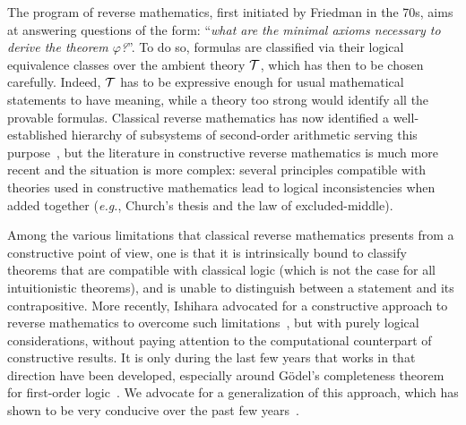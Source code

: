 \documentclass[a4paper,UKenglish,cleveref, autoref, thm-restate]{lipics-v2021}
\begin{document}
The program of reverse mathematics, first initiated by Friedman in the 70s,
aims at answering questions of the form: ``\emph{what are the minimal axioms necessary to derive the theorem $\varphi$?}''.
To do so, formulas are classified via their logical equivalence classes over the ambient theory $\mathcal T$, which has then to be chosen carefully.
Indeed, $\mathcal T$ has to be expressive enough for usual mathematical statements to have meaning, while a theory too strong would identify all the provable formulas. Classical reverse mathematics has now identified a well-established hierarchy of subsystems of second-order arithmetic serving this purpose~\cite{Simpson09}, but the literature in constructive reverse mathematics is much more recent and the situation is more complex: several principles compatible with theories used in constructive mathematics lead to logical inconsistencies when added together (\emph{e.g.}, Church’s thesis and the law of excluded-middle).





Among the various limitations that classical reverse mathematics presents
from a constructive point of view, one is that it is intrinsically
bound to classify theorems that are compatible with classical logic (which is not the case for all intuitionistic theorems), and is unable to distinguish between a statement and its contrapositive.
More recently, Ishihara advocated for a constructive approach to reverse
mathematics to overcome such limitations~\cite{Ishihara06}, but with
purely logical considerations, without paying attention to the computational counterpart of constructive results.
It is only during the last few years that works in that direction have been developed, especially around Gödel's completeness theorem for first-order logic~\cite{HerIli22,ForKirWeh21}.
We advocate for a generalization of this approach, which has shown to be very conducive over the past few years~\cite{KirZen25,CohEtAl24,HerKir24,Bauer22}.
\end{document}

